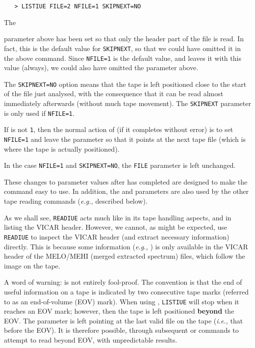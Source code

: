 \begin{verbatim}
   > LISTIUE FILE=2 NFILE=1 SKIPNEXT=NO
\end{verbatim}

The 

parameter above has been set so that only the header part of the file is read.
In fact, this is the default value for \verb+SKIPNEXT+, so that we
could have omitted it in the above command.  Since \verb+NFILE=1+ is the default
value, and 
 leaves it with this value (always), we could also have
omitted the 
 parameter above.

The \verb+SKIPNEXT=NO+ option means that the tape is left positioned close to
the start of the file just analysed, with the consequence that it can be read
almost immediately afterwards (without much tape movement)\@.  The
\verb+SKIPNEXT+
parameter is only used if \verb+NFILE=1+.

If 
 is not \verb+1+, then the normal action of 
 (if
it completes without error) is to set \verb+NFILE=1+ and leave the
parameter so that it points at the next tape file (which is where the tape is
actually positioned)\@.

In the case \verb+NFILE=1+ and \verb+SKIPNEXT=NO+, the \verb+FILE+ parameter
is left unchanged.

These changes to parameter values after 
 has completed are
designed to make the command easy to use.  In addition, the 
 and
 parameters are also used by the other tape reading commands
({\it{e.g.,}}  described below)\@.

As we shall see, \verb+READIUE+ acts much like 
 in its tape
handling aspects, and in listing the VICAR header.  However, we cannot, as might
be expected, use \verb+READIUE+ to inspect the VICAR header (and extract
necessary information) directly.  This is because some information ({\it{e.g.,}}
) is only available in the VICAR header of the MELO/MEHI (merged
extracted spectrum) files, which follow the image on the tape.

A word of warning: 
 is not entirely fool-proof.  The convention
is that the end of useful information on a tape is indicated by two
consecutive tape marks (referred to as an end-of-volume (EOV) mark)\@.
When using ,
\verb+LISTIUE+ will stop when it reaches an EOV
mark; however, then the tape is left positioned {\bf beyond} the EOV\@.  The
 parameter is left pointing at the last valid file on the tape
({\it{i.e.,}}  that before the EOV)\@.
It is therefore possible, through subsequent 
 or 
commands to attempt to read beyond EOV, with unpredictable results.

